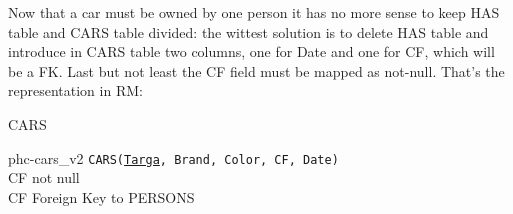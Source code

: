 \documentclass[class=book, crop=false, oneside]{standalone}
\begin{document}
Now that a car must be owned by one person it has no more sense to keep HAS table and CARS table divided: the wittest solution is to delete HAS table and introduce in CARS table two columns, one for Date and one for CF, which will be a FK. Last but not least the CF field must be mapped as not-null.
That's the representation in RM:
\vskip 20pt
\begin{minipage}{.8\textwidth}
	CARS
	\begin{table}[H]

		{phc-cars_v2}
		\texttt{CARS(\underline{Targa}, Brand, Color, CF, Date)}
		\\CF not null
		\\CF Foreign Key to PERSONS
	\end{table}
\end{minipage}


%
%
%
\end{document}

